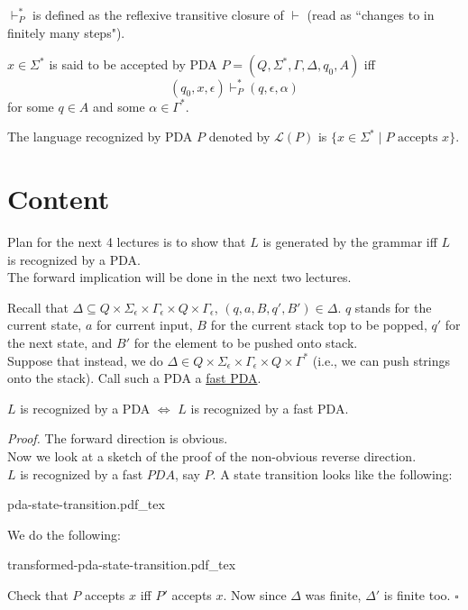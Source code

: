 \documentclass[a4paper]{article}
\newenvironment{proof}{\begin{breakbox}\textit{Proof.}}{\hfill$\square$\end{breakbox}}
\newcommand{\nl}{\vspace{0.2cm}\\}
\newcommand{\mc}{\mathcal}
\renewcommand{\L}{\mc{L}}
\newcommand{\changesto}{\vdash}
\newcommand{\incfig}[1]{%
    \def\svgwidth{\columnwidth}
    {#1.pdf_tex}
}
\begin{document}
\begin{defn}
    $\changesto^*_P$ is defined as the reflexive transitive closure of $\changesto$ (read as ``changes to in finitely many steps").
\end{defn}

\begin{defn}
    $x \in \Sigma^*$ is said to be accepted by PDA $P = (Q, \Sigma^*, \Gamma, \Delta, q_0, A)$ iff
    $$(q_0, x, \epsilon) \changesto^*_P (q, \epsilon, \alpha)$$
    for some $q \in A$ and some $\alpha \in \Gamma^*$.
\end{defn}


\begin{defn}
    The language recognized by PDA $P$ denoted by $\L(P)$ is $\{x \in \Sigma^* \mid P \text{ accepts }x\}$.
\end{defn}

\section{Content}

Plan for the next 4 lectures is to show that $L$ is generated by the grammar iff $L$ is recognized by a PDA.\nl

The forward implication will be done in the next two lectures.

Recall that $\Delta \subseteq Q \times \Sigma_\epsilon \times \Gamma_\epsilon \times Q \times \Gamma_\epsilon$, $(q, a, B, q', B') \in \Delta$. $q$ stands for the current state, $a$ for current
input, $B$ for the current stack top to be popped, $q'$ for the next state, and $B'$ for the element to be pushed onto stack.\nl

Suppose that instead, we do $\Delta \in Q \times \Sigma_\epsilon \times \Gamma_\epsilon \times Q \times \Gamma^*$ (i.e., we can push strings onto the stack). Call such a PDA a \underline{fast
PDA}.

\begin{theorem}
    $L$ is recognized by a PDA $\iff$ $L$ is recognized by a fast PDA.
\end{theorem}

\begin{proof}
    The forward direction is obvious.\nl
    Now we look at a sketch of the proof of the non-obvious reverse direction.\nl
    $L$ is recognized by a fast $PDA$, say $P$. A state transition looks like the following:
    \begin{center}
        
    \incfig{pda-state-transition}
    \end{center}
    We do the following:
    \begin{center}
    \incfig{transformed-pda-state-transition}
    \end{center}
    Check that $P$ accepts $x$ iff $P'$ accepts $x$. Now since $\Delta$ was finite, $\Delta'$ is finite too.
\end{proof}
\end{document}
